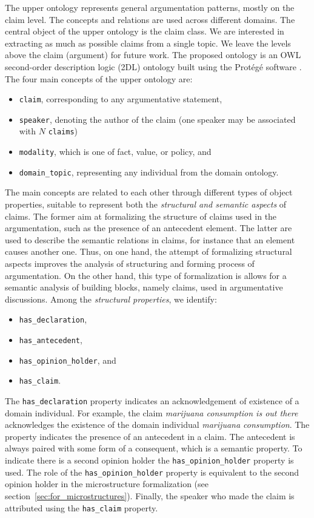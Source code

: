 The upper ontology represents general argumentation patterns, mostly on the
claim level.  The concepts and relations are used across different domains.
The central object of the upper ontology is the claim class. We are interested
in extracting as much as possible claims from a single topic. We leave the
levels above the claim (argument) for future work. The proposed ontology is an
OWL second-order description logic (2DL) ontology built using the
Prot\'{e}g\'{e} software \citep{gennari2003evolution}. The four main concepts
of the upper ontology are:
\begin{itemize}
	\item \texttt{claim}, corresponding to any argumentative statement,
	\item \texttt{speaker},  denoting the author of the claim
		(one speaker may be associated with $N$ \texttt{claims})
	\item \texttt{modality}, which is one of fact, value, or policy, and
	\item \texttt{domain\_topic}, representing any individual from the domain ontology.
\end{itemize}

The main concepts are related to each other through different types of object
properties, suitable to represent both the \emph{structural and semantic aspects} of
claims. The former aim at formalizing the structure of claims used in
the argumentation, such as the presence of an antecedent element. The latter
are used to describe the semantic relations in claims, for instance that
an element causes another one. Thus, on one hand, the attempt of 
formalizing structural aspects improves the analysis of structuring and
forming process of argumentation. On the other hand, this type of formalization
is allows for a semantic analysis of building blocks, namely claims, used in 
argumentative discussions. Among the \emph{structural properties}, we identify:
\begin{itemize}
\item \texttt{has\_declaration}, 
\item \texttt{has\_antecedent},
\item \texttt{has\_opinion\_holder}, and
\item \texttt{has\_claim}. 
\end{itemize}
The \texttt{has\_declaration} property indicates an acknowledgement of
existence of a domain individual. For example, the claim 
\emph{marijuana consumption is out there} acknowledges
the existence of the domain individual \emph{marijuana consumption}.
The  property indicates the presence of an 
antecedent in a claim. The antecedent is always paired with some
form of a consequent, which is a semantic property. To indicate
there is a second opinion holder the \texttt{has\_opinion\_holder}
property is used. The role of the \texttt{has\_opinion\_holder}
property is equivalent to the second opinion holder in the microstructure
formalization (see section~\ref{sec:for_microstructures}). Finally, the speaker
who made the claim is attributed using the \texttt{has\_claim} property.

